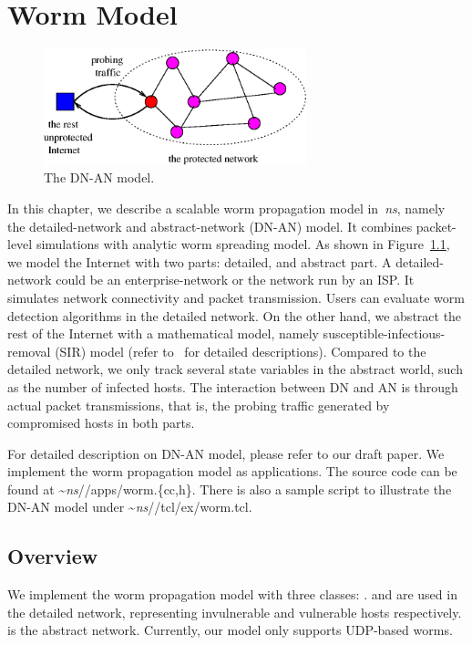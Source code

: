 \chapter{Worm Model}
\label{chap:worm}

\begin{figure}[tb] 
  \centerline{\includegraphics [width=3in] {dn-an.eps}}
  \caption{\small The DN-AN model.}
  \label{fig:dn-an}
\end{figure}

In this chapter,
  we describe a scalable worm propagation model in~\emph{ns},
  namely the detailed-network and abstract-network (DN-AN) model.
It combines packet-level simulations with analytic worm spreading model.
As shown in Figure~\ref{fig:dn-an},
  we model the Internet with two parts: detailed, and abstract part.
A detailed-network could be an enterprise-network or the network run by an ISP.
It simulates network connectivity and packet transmission.
Users can evaluate worm detection algorithms in the detailed network.
On the other hand,
  we abstract the rest of the Internet with a mathematical model,
  namely susceptible-infectious-removal (SIR) model
  (refer to~\cite{Hethcote00inf} for detailed descriptions).
Compared to the detailed network,
  we only track several state variables in the abstract world,
  such as the number of infected hosts.
The interaction between DN and AN is through actual packet transmissions,
  that is, the probing traffic generated by compromised hosts in
  both parts.

For detailed description on DN-AN model,
  please refer to our draft paper.
We implement the worm propagation model as applications.
The source code can be found at \textasciitilde\emph{ns}/{/apps/worm.\{cc,h\}}.
There is also a sample script to illustrate the DN-AN model under
  \textasciitilde\emph{ns}/{/tcl/ex/worm.tcl}.

\section{Overview}
\label{sec:worm:overview}

We implement the worm propagation model with three classes:
  . 
 and  are used in the detailed network,
  representing invulnerable and vulnerable hosts respectively.
 is the abstract network.
Currently,
  our model only supports UDP-based worms.

